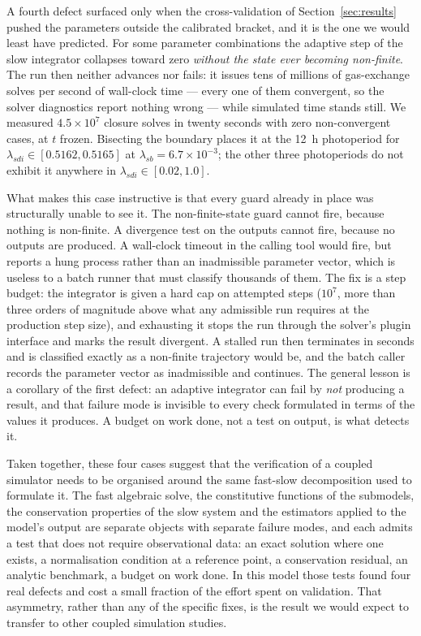 \documentclass[a4paper,fleqn]{cas-sc}
\begin{document}
A fourth defect surfaced only when the cross-validation of
Section~\ref{sec:results} pushed the parameters outside the calibrated
bracket, and it is the one we would least have predicted. For some parameter
combinations the adaptive step of the slow integrator collapses toward zero
\emph{without the state ever becoming non-finite}. The run then neither
advances nor fails: it issues tens of millions of gas-exchange solves per
second of wall-clock time --- every one of them convergent, so the solver
diagnostics report nothing wrong --- while simulated time stands still. We
measured $4.5\times10^{7}$ closure solves in twenty seconds with zero
non-convergent cases, at $t$ frozen. Bisecting the boundary places it at the
12~h photoperiod for $\lambda_{sdi} \in [0.5162, 0.5165]$ at
$\lambda_{sb} = 6.7\times10^{-3}$; the other three photoperiods do not exhibit
it anywhere in $\lambda_{sdi} \in [0.02, 1.0]$.

What makes this case instructive is that every guard already in place was
structurally unable to see it. The non-finite-state guard cannot fire, because
nothing is non-finite. A divergence test on the outputs cannot fire, because no
outputs are produced. A wall-clock timeout in the calling tool would fire, but
reports a hung process rather than an inadmissible parameter vector, which is
useless to a batch runner that must classify thousands of them. The fix is a
step budget: the integrator is given a hard cap on attempted steps
($10^{7}$, more than three orders of magnitude above what any admissible run
requires at the production step size), and exhausting it stops the run through
the solver's plugin interface and marks the result divergent. A stalled run
then terminates in seconds and is classified exactly as a non-finite
trajectory would be, and the batch caller records the parameter vector as
inadmissible and continues. The general lesson is a corollary of the first
defect: an adaptive integrator can fail by \emph{not} producing a result, and
that failure mode is invisible to every check formulated in terms of the
values it produces. A budget on work done, not a test on output, is what
detects it.

Taken together, these four cases suggest that the verification of a coupled
simulator needs to be organised around the same fast-slow decomposition used
to formulate it. The fast algebraic solve, the constitutive functions of the
submodels, the conservation properties of the slow system and the estimators
applied to the model's output are separate objects with separate failure
modes, and each admits a test that does not require observational data: an
exact solution where one exists, a normalisation condition at a reference
point, a conservation residual, an analytic benchmark, a budget on work done.
In this model those tests found four real defects and cost a small fraction of
the effort spent on validation. That asymmetry, rather than any of the specific fixes,
is the result we would expect to transfer to other coupled simulation
studies.
\end{document}
